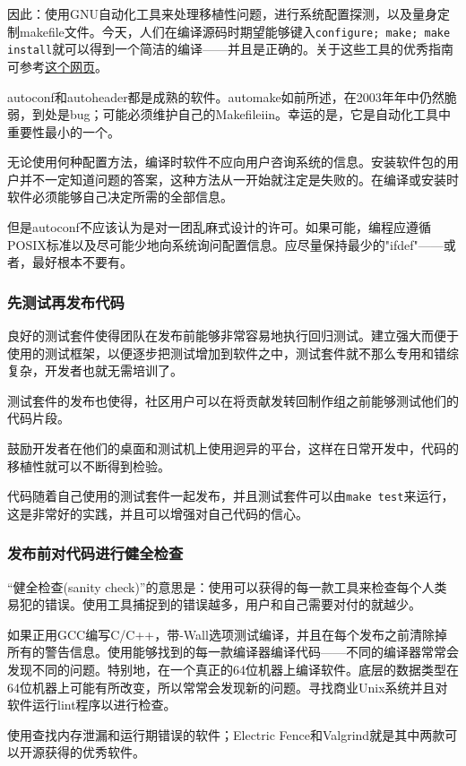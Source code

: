 \documentclass[12pt,oneside]{ctexbook}
\begin{document}
\begin{common-format}
因此：使用GNU自动化工具来处理移植性问题，进行系统配置探测，以及量身定制makefile文件。今天，人们在编译源码时期望能够键入\verb+configure; make; make install+就可以得到一个简洁的编译——并且是正确的。关于这些工具的优秀指南可参考\href{http://seul.org/docs/autotut/}{这个网页}。

autoconf和autoheader都是成熟的软件。automake如前所述，在2003年年中仍然脆弱，到处是bug；可能必须维护自己的Makefileiin。幸运的是，它是自动化工具中重要性最小的一个。

无论使用何种配置方法，编译时软件不应向用户咨询系统的信息。安装软件包的用户并不一定知道问题的答案，这种方法从一开始就注定是失败的。在编译或安装时软件必须能够自己决定所需的全部信息。

但是autoconf不应该认为是对一团乱麻式设计的许可。如果可能，编程应遵循POSIX标准以及尽可能少地向系统询问配置信息。应尽量保持最少的"ifdef"——或者，最好根本不要有。

\subsubsection{先测试再发布代码}
良好的测试套件使得团队在发布前能够非常容易地执行回归测试。建立强大而便于使用的测试框架，以便逐步把测试增加到软件之中，测试套件就不那么专用和错综复杂，开发者也就无需培训了。

测试套件的发布也使得，社区用户可以在将贡献发转回制作组之前能够测试他们的代码片段。

鼓励开发者在他们的桌面和测试机上使用迥异的平台，这样在日常开发中，代码的移植性就可以不断得到检验。

代码随着自己使用的测试套件一起发布，并且测试套件可以由\verb+make test+来运行，这是非常好的实践，并且可以增强对自己代码的信心。

\subsubsection{发布前对代码进行健全检查}
“健全检查(sanity check)”的意思是：使用可以获得的每一款工具来检查每个人类易犯的错误。使用工具捕捉到的错误越多，用户和自己需要对付的就越少。

如果正用GCC编写C/C++，带-Wall选项测试编译，并且在每个发布之前清除掉所有的警告信息。使用能够找到的每一款编译器编译代码——不同的编译器常常会发现不同的问题。特别地，在一个真正的64位机器上编译软件。底层的数据类型在64位机器上可能有所改变，所以常常会发现新的问题。寻找商业Unix系统并且对软件运行lint程序以进行检查。

使用查找内存泄漏和运行期错误的软件；Electric Fence和Valgrind就是其中两款可以开源获得的优秀软件。


\end{common-format}
\end{document}
